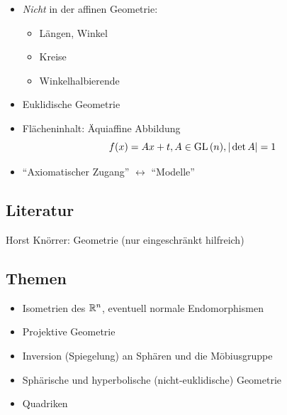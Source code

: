 \documentclass[
 a4paper,
 12pt,
 parskip=half
 ]{scrartcl}
\theoremstyle{plain}
\theoremstyle{definition}
\begin{document}
\begin{itemize}
 \item \emph{Nicht} in der affinen Geometrie: 
  \begin{itemize}
   \item Längen, Winkel
   \item Kreise
   \item Winkelhalbierende
  \end{itemize}
 \item Euklidische Geometrie
 \item Flächeninhalt: Äquiaffine Abbildung
  \[ f(x) = Ax + t, A \in \mathrm{GL}\,(n), |\det A| = 1 \]
 \item ``Axiomatischer Zugang'' $\longleftrightarrow$ ``Modelle''
\end{itemize}

\subsection{Literatur}
Horst Knörrer: Geometrie (nur eingeschränkt hilfreich)

\subsection{Themen}
\begin{itemize}
 \item Isometrien des $\mathbb{R}^n$, eventuell normale Endomorphismen
 \item Projektive Geometrie
 \item Inversion (Spiegelung) an Sphären und die Möbiusgruppe
 \item Sphärische und hyperbolische (nicht-euklidische) Geometrie
 \item Quadriken
\end{itemize}
\end{document}
